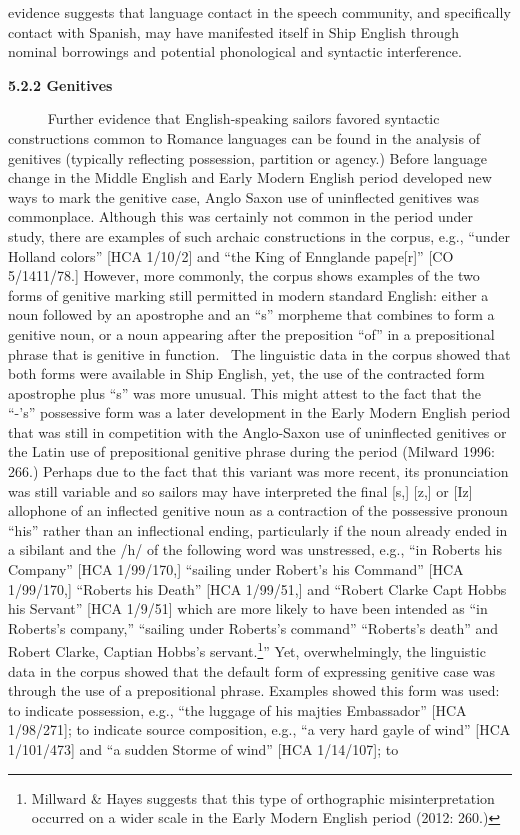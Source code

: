 \begin{styleStandard}
evidence suggests that language contact in the speech community, and specifically contact with Spanish, may have manifested itself in Ship English through nominal borrowings and potential phonological and syntactic interference. ~
\end{styleStandard}

\begin{styleStandard}
\textbf{5.2.2 Genitives}
\end{styleStandard}

\begin{styleStandard}
~~~ \ \ Further evidence that English-speaking sailors favored syntactic constructions common to Romance languages can be found in the analysis of genitives (typically reflecting possession, partition or agency.) Before language change in the Middle English and Early Modern English period developed new ways to mark the genitive case, Anglo Saxon use of uninflected genitives was commonplace. Although this was certainly not common in the period under study, there are examples of such archaic constructions in the corpus, e.g., “under Holland colors” [HCA 1/10/2] and “the King of Ennglande pape[r]” [CO 5/1411/78.] However, more commonly, the corpus shows examples of the two forms of genitive marking still permitted in modern standard English: either a noun followed by an apostrophe and an “s” morpheme that combines to form a genitive noun, or a noun appearing after the preposition “of” in a prepositional phrase that is genitive in function. ~The linguistic data in the corpus showed that both forms were available in Ship English, yet, the use of the contracted form apostrophe plus “s” was more unusual. This might attest to the fact that the “-’s” possessive form was a later development in the Early Modern English period that was still in competition with the Anglo-Saxon use of uninflected genitives or the Latin use of prepositional genitive phrase during the period (Milward 1996: 266.) Perhaps due to the fact that this variant was more recent, its pronunciation was still variable and so sailors may have interpreted the final [s,] [z,] or [Iz] allophone of an inflected genitive noun as a contraction of the possessive pronoun “his” rather than an inflectional ending, particularly if the noun already ended in a sibilant and the /h/ of the following word was unstressed, e.g., “in Roberts his Company” [HCA 1/99/170,] “sailing under Robert’s his Command” [HCA 1/99/170,] “Roberts his Death” [HCA 1/99/51,] and “Robert Clarke Capt Hobbs his Servant” [HCA 1/9/51] which are more likely to have been intended as “in Roberts’s company,” “sailing under Roberts’s command” “Roberts’s death” and Robert Clarke, Captian Hobbs’s servant.\footnote{ Millward \& Hayes suggests that this type of orthographic misinterpretation occurred on a wider scale in the Early Modern English period (2012: 260.)}” Yet, overwhelmingly, the linguistic data in the corpus showed that the default form of expressing genitive case was through the use of a prepositional phrase. Examples showed this form was used: to indicate possession, e.g., “the luggage of his majties Embassador” [HCA 1/98/271]; to indicate source composition, e.g., “a very hard gayle of wind” [HCA 1/101/473] and “a sudden Storme of wind” [HCA 1/14/107]; to 
\end{styleStandard}
